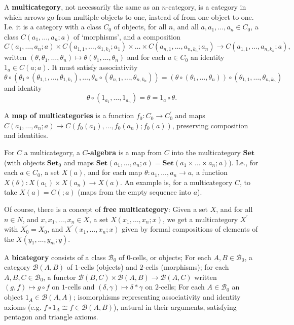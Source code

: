 \documentclass{amsbook}
\newcommand{\Catb}[1]{\mathbf{#1}}
\newcommand{\SET}{\Catb{Set}}
\theoremstyle{definition}
\begin{document}
  A \textbf{multicategory}, not necessarily the same as an $ n $-category, is a category in which arrows go from multiple objects to one, instead of from one object to one. I.e. it is a category with a class $ C_0 $ of objects, for all $ n $, and all $ a, a_1, \dots, a_n \in C_0 $, a class $ C(a_1, \dots, a_n; a) $ of `morphisms', and a composition
  \[ C(a_1, \dots, a_n; a) \times C(a_{1, 1}, \dots, a_{1, k_1}; a_1) \times \dots \times C(a_{n, 1}, \dots, a_{n, k_n}; a_n) \to C(a_{1, 1}, \dots, a_{n, k_n}; a), \]
  written $ (\theta, \theta_1, \dots, \theta_n) \mapsto \theta (\theta_1, \dots, \theta_n) $ and for each $ a \in C_0 $ an identity $ 1_a \in C(a; a) $. It must satisfy associativity
  \[ \theta \circ(\theta_1 \circ(\theta_{1, 1}, \dots, \theta_{1, k_1}), \dots, \theta_n \circ (\theta_{n, 1}, \dots, \theta_{n, k_n})) = (\theta \circ (\theta_1, \dots, \theta_n)) \circ (\theta_{1, 1}, \dots, \theta_{n, k_n}) \]
  and identity
  \[ \theta \circ (1_{a_1}, \dots, 1_{a_n}) = \theta = 1_a \circ \theta. \]

  A \textbf{map of multicategories} is a function $ f_0: C_0 \to C_0^\prime $ and maps $ C(a_1, \dots, a_n; a) \to C(f_0(a_1), \dots, f_0(a_n); f_0(a)) $, preserving composition and identities.

  For $ C $ a multicategory, a \textbf{$ C $-algebra} is a map from $ C $ into the multicategory $ \mathbf{Set} $ (with objects $ \SET_0 $ and maps $ \SET(a_1, \dots, a_n; a) = \SET(a_1 \times \dots \times a_n ; a) $). I.e., for each $ a \in C_0 $, a set $ X(a) $, and for each map $ \theta: a_1, \dots, a_n \to a $, a function $ X(\theta): X(a_1) \times X(a_n) \to X(a) $. An example is, for a multicategory $ C $, to take $ X(a) = C(; a) $ (maps from the empty sequence into $ a $).

  Of course, there is a concept of \textbf{free multicategory}: Given a set $ X $, and for all $ n \in N $, and $ x, x_1, \dots, x_n \in X $, a set $ X(x_1, \dots, x_n ; x) $, we get a multicategory $ X^\prime $ with $ X^\prime_0 = X_0 $, and $ X^\prime(x_1, \dots, x_n; x) $ given by formal compositions of elements of the $ X(y_1, \dots, y_m; y) $.

  A \textbf{bicategory} consists of a class $ \mathcal B_0 $ of $ 0 $-cells, or objects; For each $ A, B \in \mathcal B_0 $, a category $ \mathcal B(A, B) $ of $ 1 $-cells (objects) and $ 2 $-cells (morphisms); for each $ A, B, C \in \mathcal B_0 $, a functor $ \mathcal B(B, C) \times \mathcal B(A, B) \to \mathcal B(A, C) $ written $ (g, f) \mapsto g \circ f $ on $ 1 $-cells and $ (\delta, \gamma) \mapsto \delta * \gamma $ on $ 2 $-cells; For each $ A \in \mathcal B_0 $ an object $ 1_A \in \mathcal B(A, A) $; isomorphisms representing associativity and identity axioms (e.g. $ f \circ 1_A \cong f \in \mathcal B(A, B) $), natural in their arguments, satisfying pentagon and triangle axioms.
\end{document}
